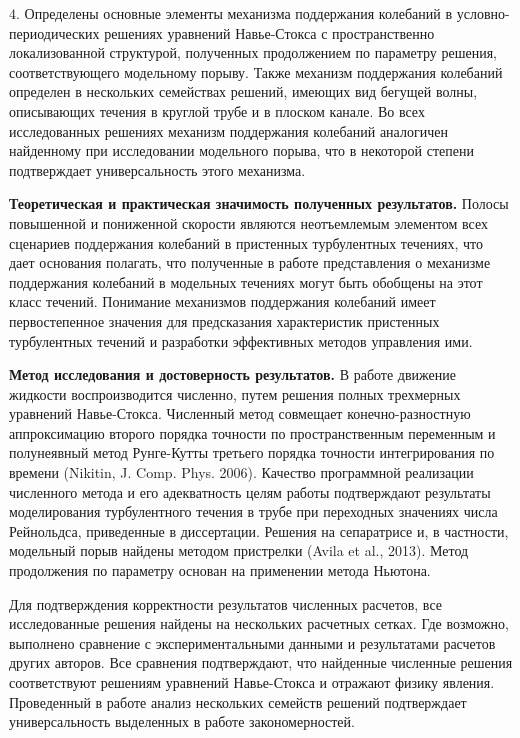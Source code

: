 \noindent $4.$ Определены основные элементы механизма поддержания колебаний в условно-периодических решениях уравнений Навье-Стокса с пространственно локализованной структурой, полученных продолжением по параметру решения, соответствующего модельному порыву. Также механизм поддержания колебаний определен в нескольких семействах решений, имеющих вид бегущей волны, описывающих течения в круглой трубе и в плоском канале. Во всех исследованных решениях механизм поддержания колебаний аналогичен найденному при исследовании модельного порыва, что в некоторой степени подтверждает универсальность этого механизма. 

{\bf Теоретическая и практическая значимость полученных результатов.}
Полосы повышенной и пониженной скорости являются неотъемлемым элементом всех сценариев поддержания колебаний в пристенных турбулентных течениях, что дает основания полагать, что полученные в работе представления о механизме поддержания колебаний в модельных течениях могут быть обобщены на этот класс течений. Понимание механизмов поддержания колебаний имеет первостепенное значения для предсказания характеристик пристенных турбулентных течений и разработки эффективных методов управления ими.

\textbf{Метод исследования и достоверность результатов.}
В работе движение жидкости воспроизводится численно, путем решения полных трехмерных уравнений Навье-Стокса. Численный метод совмещает конечно-разностную аппроксимацию второго порядка точности по пространственным переменным и полунеявный метод Рунге-Кутты третьего порядка точности интегрирования по времени (Nikitin, J. Comp. Phys. 2006). Качество программной реализации численного метода и его адекватность целям работы подтверждают результаты моделирования турбулентного течения в трубе при переходных значениях числа Рейнольдса, приведенные в диссертации. Решения на сепаратрисе и, в частности, модельный порыв найдены методом пристрелки (Avila et al., 2013). Метод продолжения по параметру основан на применении метода Ньютона. %

Для подтверждения корректности результатов численных расчетов, все исследованные решения найдены на нескольких расчетных сетках. Где возможно, выполнено сравнение с экспериментальными данными и результатами расчетов других авторов. Все сравнения подтверждают, что найденные численные решения соответствуют решениям уравнений Навье-Стокса и отражают физику явления. Проведенный в работе анализ нескольких семейств решений подтверждает универсальность выделенных в работе закономерностей. %

